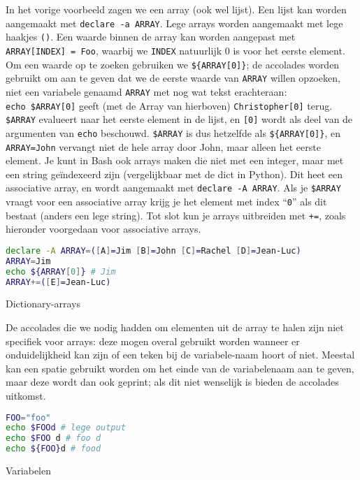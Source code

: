 In het vorige voorbeeld zagen we een array (ook wel lijst). Een lijst kan worden aangemaakt met \texttt{declare\ -a\ ARRAY}. Lege arrays worden aangemaakt met lege haakjes \texttt{()}. Een waarde binnen de array kan worden aangepast met \texttt{ARRAY{[}INDEX{]}\ =\ Foo}, waarbij we \texttt{INDEX} natuurlijk 0 is voor het eerste element. Om een waarde op te zoeken gebruiken we \texttt{\$\{ARRAY{[}0{]}\}}; de accolades worden gebruikt om aan te geven dat we de eerste waarde van \texttt{ARRAY} willen opzoeken, niet een variabele genaamd \texttt{ARRAY} met nog wat tekst erachteraan: \texttt{echo\ \$ARRAY{[}0{]}} geeft (met de Array van hierboven) \texttt{Christopher{[}0{]}} terug. \texttt{\$ARRAY} evalueert naar het eerste element in de lijst, en \texttt{{[}0{]}} wordt als deel van de argumenten van \texttt{echo} beschouwd. \texttt{\$ARRAY} is dus hetzelfde als \texttt{\$\{ARRAY{[}0{]}\}}, en \texttt{ARRAY=John} vervangt niet de hele array door John, maar alleen het eerste element. Je kunt in Bash ook arrays maken die niet met een integer, maar met een string geïndexeerd zijn (vergelijkbaar met de dict in Python). Dit heet een associative array, en wordt aangemaakt met \texttt{declare\ -A\ ARRAY}. Als je \texttt{\$ARRAY} vraagt voor een associative array krijg je het element met index ``\texttt{0}'' als dit bestaat (anders een lege string). Tot slot kun je arrays uitbreiden met \texttt{+=}, zoals hieronder voorgedaan voor associative arrays.

\begin{listing}
\begin{lstlisting}[language=Bash]
declare -A ARRAY=([A]=Jim [B]=John [C]=Rachel [D]=Jean-Luc)
ARRAY=Jim
echo ${ARRAY[0]} # Jim
ARRAY+=([E]=Jean-Luc)
\end{lstlisting}
\caption{Dictionary-arrays}
\end{listing}

De accolades die we nodig hadden om elementen uit de array te halen zijn niet specifiek voor arrays: deze mogen overal gebruikt worden wanneer er onduidelijkheid kan zijn of een teken bij de variabele-naam hoort of niet. Meestal kan een spatie gebruikt worden om het einde van de variabelenaam aan te geven, maar deze wordt dan ook geprint; als dit niet wenselijk is bieden de accolades uitkomst.

\begin{listing}
\begin{lstlisting}[language=Bash]
FOO="foo"
echo $FOOd # lege output
echo $FOO d # foo d
echo ${FOO}d # food
\end{lstlisting}
\caption{Variabelen}
\end{listing}

